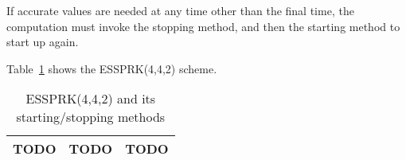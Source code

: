 If accurate values are needed at any time other than the final time, the
computation must invoke the stopping method, and then the starting method to start up again. 

Table~\ref{tab:essprk442} shows the ESSPRK(4,4,2) scheme.

\begin{table}
  \caption{ESSPRK(4,4,2) and its starting/stopping methods}
  \label{tab:essprk442}
  \centering
  \begin{tabular}{|c|c|c|}
    \hline
    TODO & TODO & TODO \\
    \hline
  \end{tabular}
\end{table}
